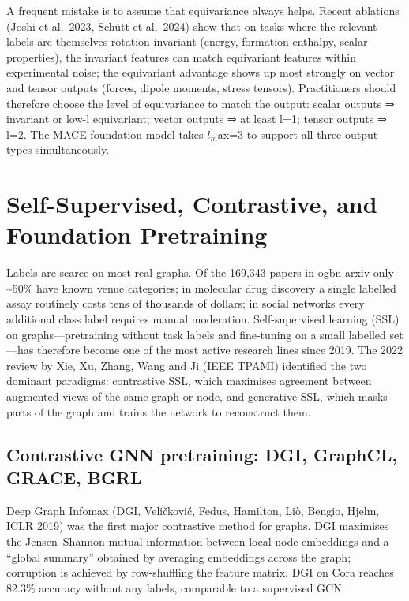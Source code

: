 \documentclass{article}
\begin{document}
A frequent mistake is to assume that equivariance always helps. Recent ablations (Joshi et al.~2023, Schütt et al.~2024) show that on tasks where the relevant labels are themselves rotation-invariant (energy, formation enthalpy, scalar properties), the invariant features can match equivariant features within experimental noise; the equivariant advantage shows up most strongly on vector and tensor outputs (forces, dipole moments, stress tensors). Practitioners should therefore choose the level of equivariance to match the output: scalar outputs ⇒ invariant or low-l equivariant; vector outputs ⇒ at least l=1; tensor outputs ⇒ l=2. The MACE foundation model takes \(l_m\)ax=3 to support all three output types simultaneously.
\section{Self-Supervised, Contrastive, and Foundation Pretraining}\label{sec:self-supervised-contrastive-and-foundation-pretraining}
Labels are scarce on most real graphs. Of the 169,343 papers in ogbn-arxiv only \textasciitilde50\% have known venue categories; in molecular drug discovery a single labelled assay routinely costs tens of thousands of dollars; in social networks every additional class label requires manual moderation. Self-supervised learning (SSL) on graphs---pretraining without task labels and fine-tuning on a small labelled set---has therefore become one of the most active research lines since 2019. The 2022 review by Xie, Xu, Zhang, Wang and Ji (IEEE TPAMI) identified the two dominant paradigms: contrastive SSL, which maximises agreement between augmented views of the same graph or node, and generative SSL, which masks parts of the graph and trains the network to reconstruct them.

\subsection{Contrastive GNN pretraining: DGI, GraphCL, GRACE, BGRL}\label{contrastive-gnn-pretraining-dgi-graphcl-grace-bgrl}

Deep Graph Infomax (DGI, Veličković, Fedus, Hamilton, Liò, Bengio, Hjelm, ICLR 2019) was the first major contrastive method for graphs. DGI maximises the Jensen--Shannon mutual information between local node embeddings and a ``global summary'' obtained by averaging embeddings across the graph; corruption is achieved by row-shuffling the feature matrix. DGI on Cora reaches 82.3\% accuracy without any labels, comparable to a supervised GCN.
\end{document}
